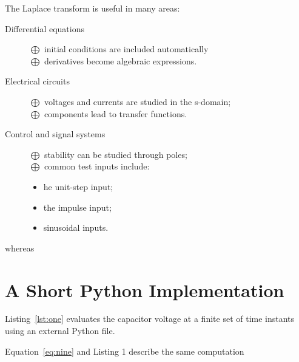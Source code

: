 \documentclass[a4paper]{article}
\begin{document}
The Laplace transform is useful in many areas:
\begin{description}
    \item[Differential equations] $\bigoplus$ initial conditions are included automatically \\
    $\bigoplus$ derivatives become algebraic expressions.
    \item[Electrical circuits] $\bigoplus$ voltages and currents are studied in the s-domain; \\
    $\bigoplus$ components lead to transfer functions.
    \item[Control and signal systems] $\bigoplus$ stability can be studied through poles; \\
    $\bigoplus$ common test inputs include:
    \begin{itemize}[label=$\triangleright$]
        \item he unit-step input;
        \item the impulse input;
        \item sinusoidal inputs.
    \end{itemize}
    
\end{description}

 whereas 

\section{A Short Python Implementation}
Listing~\ref{lst:one} evaluates the capacitor voltage at a finite set of time instants using an external Python
file.
%     

Equation~\ref{eq:nine} and Listing 1 describe the same computation
\printbibliography
\end{document}
